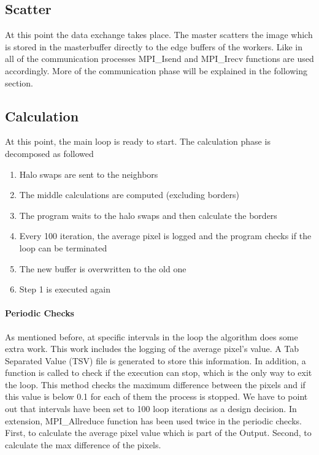 \documentclass[12pt,a4paper]{article}
\begin{document}
    \subsection{Scatter}
        At this point the data exchange takes place. The master scatters the image which is stored in the masterbuffer directly to the edge buffers of the workers. Like in all of the communication processes MPI\_Isend and MPI\_Irecv functions are used accordingly. More of the communication phase will be explained in the following section.

    \subsection{Calculation}
        At this point, the main loop is ready to start. The calculation phase is decomposed as followed
        \begin{enumerate}
          \item Halo swaps are sent to the neighbors
          \item The middle calculations are computed (excluding borders)
          \item The program waits to the halo swaps and then calculate the borders
          \item Every 100 iteration, the average pixel is logged and the program checks if the loop can be terminated
          \item The new buffer is overwritten to the old one
          \item Step 1 is executed again
        \end{enumerate}

        \paragraph{Periodic Checks}
        	As mentioned before, at specific intervals in the loop the algorithm does some extra work. This work includes the logging of the average pixel's value. A Tab Separated Value (TSV) file is generated to store this information. In addition, a function is called to check if the execution can stop, which is the only way to exit the loop. This method checks the maximum difference between the pixels and if this value is below 0.1 for each of them the process is stopped. We have to point out that intervals have been set to 100 loop iterations as a design decision. In extension, MPI\_Allreduce function has been used twice in the periodic checks. First, to calculate the average pixel value which is part of the Output. Second, to calculate the max difference of the pixels.
\end{document}

